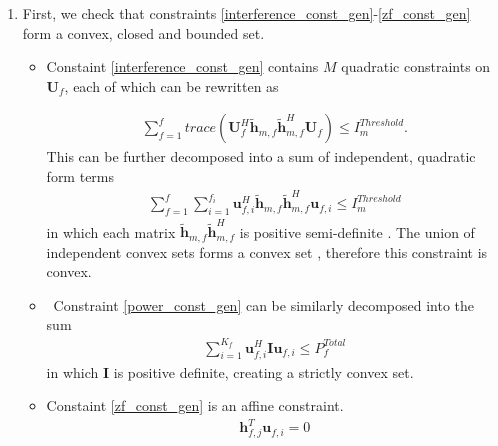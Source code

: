 \begin{enumerate}
\item
First, we check that constraints \eqref{interference_const_gen}-\eqref{zf_const_gen} form a convex, closed and bounded set. 

\begin{itemize}

\item
	Constaint \eqref{interference_const_gen} contains $M$ quadratic constraints on $\mathbf{U}_f$, each of which 
	can be rewritten  as

\begin{gather*}
	\sum_{f=1}^{f}
	trace(\mathbf{U}_{f}^H \tilde{\mathbf{h}}_{m,f} \tilde{\mathbf{h}}_{m,f}^H \mathbf{U}_f )\leq 
	I^{Threshold}_{m}.
\end{gather*}
This can be further decomposed into a sum of independent, quadratic form terms
	\begin{gather*}
	\sum_{f=1}^{f}
	\sum_{i=1}^{f_i}
	\mathbf{u}_{f,i}^H\tilde{\mathbf{h}}_{m,f} \tilde{\mathbf{h}}_{m,f}^H
	\mathbf{u}_{f,i} \leq I^{Threshold}_{m}
	\end{gather*}
in which each matrix $\tilde{\mathbf{h}}_{m,f} \tilde{\mathbf{h}}_{m,f}^H$ is positive semi-definite \cite[p.~8,9]{BoV:04}. The union of independent convex sets forms a convex set \cite{BoV:04}, therefore this constraint is convex. 

\item \
	Constraint \eqref{power_const_gen} can be similarly decomposed into the sum
	\begin{gather*}
		\sum_{i=1}^{K_{f}}\mathbf{u}_{f,i}^{H} \mathbf{I} 		
		\mathbf{u}_{f,i} \leq  P^{Total}_{f}
	\end{gather*}
	in which $\mathbf{I}$ is positive definite, creating a strictly convex set.

\item 
	Constaint \eqref{zf_const_gen} is an affine constraint. 
		\begin{gather*}
		\mathbf{h}_{f,j}^T \mathbf{u}_{f,i} =0
		\end{gather*}
\end{itemize}



\end{enumerate}
